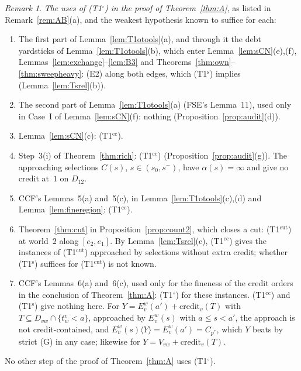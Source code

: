 \documentclass[11pt]{article}
\theoremstyle{definition}\newtheorem{definition}[theorem]{Definition}
\theoremstyle{remark}\newtheorem{remark}[theorem]{Remark}
\newcommand{\cred}{\mathrm{credit}}
\newcommand{\To}{\textup{(T1$^\circ$)}}
\newcommand{\Ts}{\textup{(T1$^{\mathrm s}$)}}
\newcommand{\Tcc}{\textup{(T1$^{\mathrm{cc}}$)}}
\newcommand{\Tcut}{\textup{(T1$^{\mathrm{cut}}$)}}
\begin{document}
\begin{remark}\label{rem:audit}
\emph{The uses of \To{} in the proof of Theorem~\ref{thm:A}}, as listed in
Remark~\ref{rem:AB}(a), and the weakest hypothesis known to suffice for each:
\begin{enumerate}[label=(\arabic*),leftmargin=*,itemsep=2pt]
\item The first part of Lemma~\ref{lem:T1otools}(a), and through it the
debt yardsticks of Lemma~\ref{lem:T1otools}(b), which enter
Lemma~\ref{lem:sCN}(e),(f), Lemmas~\ref{lem:exchange}--\ref{lem:B3} and
Theorems~\ref{thm:own}--\ref{thm:sweepheavy}: (E2) along both edges, which
\Ts{} implies (Lemma~\ref{lem:Tsrel}(b)).
\item The second part of Lemma~\ref{lem:T1otools}(a) (FSE's Lemma~11), used
only in Case~I of Lemma~\ref{lem:sCN}(f): nothing
(Proposition~\ref{prop:audit}(d)).
\item Lemma~\ref{lem:sCN}(c): \Tcc.
\item Step~3(i) of Theorem~\ref{thm:rich}: \Tcc{}
(Proposition~\ref{prop:audit}(g)). The approaching selections $C(s)$,
$s\in(s_0,s^-)$, have $\alpha(s)=\infty$ and give no credit at~$1$ on
$D_{12}$.
\item CCF's Lemmas~5(a) and~5(c), in Lemma~\ref{lem:T1otools}(c),(d) and
Lemma~\ref{lem:fineregion}: \Tcc.
\item Theorem~\ref{thm:cut} in Proposition~\ref{prop:count2}, which closes a
cut: \Tcut{} at world~$2$ along $[e_2,e_1]$. By Lemma~\ref{lem:Tsrel}(c),
\Tcc{} gives the instances of \Tcut{} approached by selections without extra
credit; whether \Ts{} suffices for \Tcut{} is not known.
\item CCF's Lemmas~6(a) and~6(c), used only for the fineness of the credit
orders in the conclusion of Theorem~\ref{thm:A}: \To{} for these
instances. \Tcc{} and \Ts{} give nothing here. For
$Y=E^w_v(a')+\cred_v(T)$ with $T\subseteq D_{vw}\cap\{t^v_w<a\}$, approached
by $E^w_v(s)$ with $a\le s<a'$, the approach is not credit-contained, and
$E^w_v(s)\langle Y\rangle=E^w_v(a')=C_{p^*}$, which $Y$ beats by strict (G)
in any case; likewise for $Y=V_{vw}+\cred_v(T)$.
\end{enumerate}
No other step of the proof of Theorem~\ref{thm:A} uses \To.
\end{remark}
\end{document}
